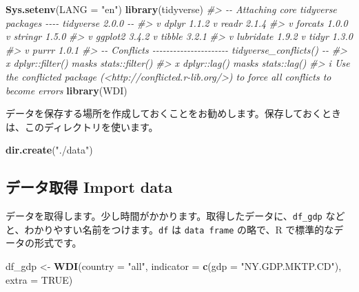\documentclass[
  xelatex, ja=standard]{bxjsbook}
\newenvironment{Shaded}{\begin{snugshade}}{\end{snugshade}}
\newcommand{\AttributeTok}[1]{\textcolor[rgb]{0.13,0.29,0.53}{#1}}
\newcommand{\CommentTok}[1]{\textcolor[rgb]{0.56,0.35,0.01}{\textit{#1}}}
\newcommand{\ConstantTok}[1]{\textcolor[rgb]{0.56,0.35,0.01}{#1}}
\newcommand{\FunctionTok}[1]{\textcolor[rgb]{0.13,0.29,0.53}{\textbf{#1}}}
\newcommand{\NormalTok}[1]{#1}
\newcommand{\OtherTok}[1]{\textcolor[rgb]{0.56,0.35,0.01}{#1}}
\newcommand{\StringTok}[1]{\textcolor[rgb]{0.31,0.60,0.02}{#1}}
\theoremstyle{definition}
\theoremstyle{definition}
\theoremstyle{definition}
\theoremstyle{definition}
\theoremstyle{remark}
\begin{document}
\begin{Shaded}
\begin{Highlighting}[]
\FunctionTok{Sys.setenv}\NormalTok{(}\AttributeTok{LANG =} \StringTok{"en"}\NormalTok{)}
\FunctionTok{library}\NormalTok{(tidyverse)}
\CommentTok{\#\textgreater{} {-}{-} Attaching core tidyverse packages {-}{-}{-}{-} tidyverse 2.0.0 {-}{-}}
\CommentTok{\#\textgreater{} v dplyr     1.1.2     v readr     2.1.4}
\CommentTok{\#\textgreater{} v forcats   1.0.0     v stringr   1.5.0}
\CommentTok{\#\textgreater{} v ggplot2   3.4.2     v tibble    3.2.1}
\CommentTok{\#\textgreater{} v lubridate 1.9.2     v tidyr     1.3.0}
\CommentTok{\#\textgreater{} v purrr     1.0.1     }
\CommentTok{\#\textgreater{} {-}{-} Conflicts {-}{-}{-}{-}{-}{-}{-}{-}{-}{-}{-}{-}{-}{-}{-}{-}{-}{-}{-}{-}{-}{-} tidyverse\_conflicts() {-}{-}}
\CommentTok{\#\textgreater{} x dplyr::filter() masks stats::filter()}
\CommentTok{\#\textgreater{} x dplyr::lag()    masks stats::lag()}
\CommentTok{\#\textgreater{} i Use the conflicted package (\textless{}http://conflicted.r{-}lib.org/\textgreater{}) to force all conflicts to become errors}
\FunctionTok{library}\NormalTok{(WDI)}
\end{Highlighting}
\end{Shaded}

データを保存する場所を作成しておくことをお勧めします。保存しておくときは、このディレクトリを使います。

\begin{Shaded}
\begin{Highlighting}[]
\FunctionTok{dir.create}\NormalTok{(}\StringTok{"./data"}\NormalTok{)}
\end{Highlighting}
\end{Shaded}

\hypertarget{ux30c7ux30fcux30bfux53d6ux5f97-import-data}{%
\subsection{データ取得 Import data}\label{ux30c7ux30fcux30bfux53d6ux5f97-import-data}}

データを取得します。少し時間がかかります。取得したデータに、\texttt{df\_gdp} などと、わかりやすい名前をつけます。\texttt{df} は \texttt{data\ frame} の略で、R で標準的なデータの形式です。

\begin{Shaded}
\begin{Highlighting}[]
\NormalTok{df\_gdp }\OtherTok{\textless{}{-}} \FunctionTok{WDI}\NormalTok{(}\AttributeTok{country =} \StringTok{"all"}\NormalTok{, }
              \AttributeTok{indicator =} \FunctionTok{c}\NormalTok{(}\AttributeTok{gdp =} \StringTok{"NY.GDP.MKTP.CD"}\NormalTok{), }
              \AttributeTok{extra =} \ConstantTok{TRUE}\NormalTok{)}
\end{Highlighting}
\end{Shaded}
\end{document}
